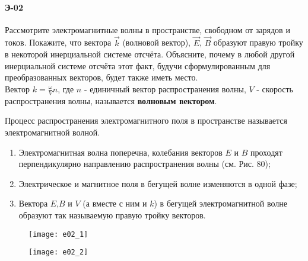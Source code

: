 \documentclass[__main__.tex]{subfiles}
\begin{document}
\paragraph{Э-02}
Рассмотрите электромагнитные волны в пространстве, свободном от зарядов и токов. Покажите, что вектора $\vec{k}$ (волновой вектор), $\vec{E}$, $\vec{B}$ образуют правую тройку в некоторой инерциальной системе отсчёта. Объясните, почему в любой другой инерциальной системе отсчёта этот факт, будучи сформулированным для преобразованных векторов, будет также иметь место.\\

Вектор $k = \frac{\omega}{V} n$, где $n$ - единичный вектор распространения волны, $V$ - скорость распространения волны, называется \textbf{волновым вектором}.

Процесс распространения электромагнитного поля в пространстве называется электромагнитной волной. 

\begin{enumerate}
\item
Электромагнитная волна поперечна, колебания векторов $E$ и $B$ проходят перпендикулярно направлению распространения волны (см. Рис. 80);
\item
Электрическое и магнитное поля в бегущей волне изменяются в одной фазе;
\item
Вектора $E$,$B$ и $V$ (а вместе с ним и $k$) в бегущей электромагнитной волне образуют так называемую правую тройку векторов.
\end{enumerate}

\begin{figure}[h]
\begin{minipage}{.45\linewidth}
    \texttt{[image: e02\_1]}
\end{minipage}
\hfill
\begin{minipage}{.45\linewidth}
    \texttt{[image: e02\_2]}
\end{minipage}
\end{figure}
\end{document}
